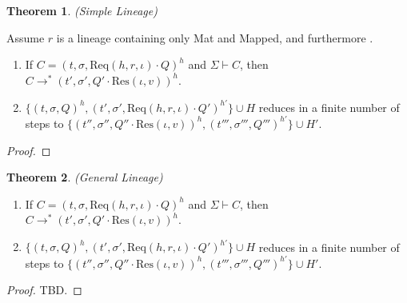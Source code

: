 \documentclass{article}
\theoremstyle{definition}
\newtheorem{thm}{Theorem}[section]
\newcommand{\Req}[3]{\text{Req}(#1, #2, #3)}
\newcommand{\Res}[2]{\text{Res}(#1, #2)}
\begin{document}
\begin{thm}
\emph{(Simple Lineage)}\label{th:simple-lineage}

Assume $r$ is a lineage containing only Mat and Mapped, and furthermore .

\begin{enumerate}

\item If $C = (t, \sigma, {\Req h r \iota} \cdot Q)^h$ and $\Sigma \vdash C$, then $C \longrightarrow^* (t', \sigma', Q' \cdot {\Res \iota v})^h$.

\item $\{ (t, \sigma, Q)^h, (t', \sigma', {\Req h r \iota} \cdot Q')^{h'} \} \cup H$ reduces in a finite number of steps to $\{ (t'', \sigma'', Q'' \cdot {\Res \iota v})^h, (t''', \sigma''', Q''')^{h'} \} \cup H'$.

\end{enumerate}

\end{thm}
\begin{proof}

\end{proof}


\begin{thm}
\emph{(General Lineage)}\label{th:gen-lineage}

\begin{enumerate}

\item If $C = (t, \sigma, {\Req h r \iota} \cdot Q)^h$ and $\Sigma \vdash C$, then $C \longrightarrow^* (t', \sigma', Q' \cdot {\Res \iota v})^h$.

\item $\{ (t, \sigma, Q)^h, (t', \sigma', {\Req h r \iota} \cdot Q')^{h'} \} \cup H$ reduces in a finite number of steps to $\{ (t'', \sigma'', Q'' \cdot {\Res \iota v})^h, (t''', \sigma''', Q''')^{h'} \} \cup H'$.

\end{enumerate}

\end{thm}
\begin{proof}
TBD.
\end{proof}



\newpage
\end{document}
